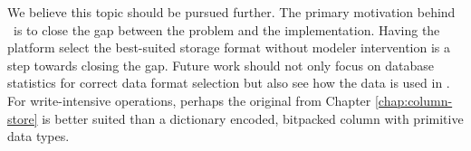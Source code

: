 We believe this topic should be pursued further. The primary motivation behind \mde~is to close the gap between the problem and the implementation. Having the platform select the best-suited storage format without modeler intervention is a step towards closing the gap. Future work should not only focus on database statistics for correct data format selection but also see how the data is used in \gap. For write-intensive operations, perhaps the original  from Chapter \ref{chap:column-store} is better suited than a dictionary encoded, bitpacked column with primitive data types.


